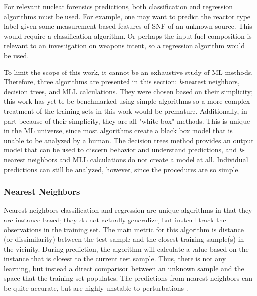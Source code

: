
For relevant nuclear forensics predictions, both classification and regression
algorithms must be used.  For example, one may want to predict the reactor type
label given some measurement-based features of \gls{SNF} of an unknown source.
This would require a classification algorithm. Or perhaps the input fuel
composition is relevant to an investigation on weapons intent, so a regression
algorithm would be used. 

To limit the scope of this work, it cannot be an exhaustive study of \gls{ML}
methods.  Therefore, three algorithms are presented in this section:
\textit{k}-nearest neighbors, decision trees, and \gls{MLL} calculations. They
were chosen based on their simplicity; this work has yet to be benchmarked
using simple algorithms so a more complex treatment of the training sets in
this work would be premature. Additionally, in part because of their
simplicity, they are all "white box" methods.  This is unique in the \gls{ML}
universe, since most algorithms create a black box model that is unable to be
analyzed by a human.  The  decision trees method provides an output model that
can be used to discern behavior and understand predictions, and
\textit{k}-nearest neighbors and \gls{MLL} calculations do not create a model
at all. Individual predictions can still be analyzed, however, since the
procedures are so simple. 

\subsubsection{Nearest Neighbors}

Nearest neighbors classification and regression are unique algorithms in
that they are instance-based; they do not actually generalize, but instead
track the observations in the training set.  The main metric for this algorithm
is distance (or dissimilarity) between the test sample and the closest training
sample(s) in the vicinity.  During prediction, the algorithm will calculate a
value based on the instance that is closest to the current test sample. Thus,
there is not any learning, but instead a direct comparison between an unknown
sample and the space that the training set populates. The predictions from
nearest neighbors can be quite accurate, but are highly unstable to
perturbations \cite{elements_stats}.

